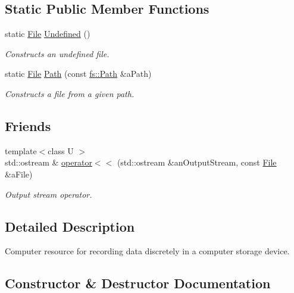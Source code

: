 \subsection*{Static Public Member Functions}
\begin{DoxyCompactItemize}
\item 
static \hyperlink{classlibrary_1_1core_1_1fs_1_1File}{File} \hyperlink{classlibrary_1_1core_1_1fs_1_1File_a985adb1a33b94dcdbed2792651eb81af}{Undefined} ()
\begin{DoxyCompactList}\small\item\em Constructs an undefined file. \end{DoxyCompactList}\item 
static \hyperlink{classlibrary_1_1core_1_1fs_1_1File}{File} \hyperlink{classlibrary_1_1core_1_1fs_1_1File_a0e0d8a8becb3cdd21775554e181452d8}{Path} (const \hyperlink{classlibrary_1_1core_1_1fs_1_1Path}{fs\+::\+Path} \&a\+Path)
\begin{DoxyCompactList}\small\item\em Constructs a file from a given path. \end{DoxyCompactList}\end{DoxyCompactItemize}
\subsection*{Friends}
\begin{DoxyCompactItemize}
\item 
{\footnotesize template$<$class U $>$ }\\std\+::ostream \& \hyperlink{classlibrary_1_1core_1_1fs_1_1File_aedbcccb29459f2d30d54a53b6850fbd2}{operator$<$$<$} (std\+::ostream \&an\+Output\+Stream, const \hyperlink{classlibrary_1_1core_1_1fs_1_1File}{File} \&a\+File)
\begin{DoxyCompactList}\small\item\em Output stream operator. \end{DoxyCompactList}\end{DoxyCompactItemize}


\subsection{Detailed Description}
Computer resource for recording data discretely in a computer storage device. 

\subsection{Constructor \& Destructor Documentation}
\mbox{\label{classlibrary_1_1core_1_1fs_1_1File_a7490060f19a21d4ee58bb6cec87a1ca6}} 
